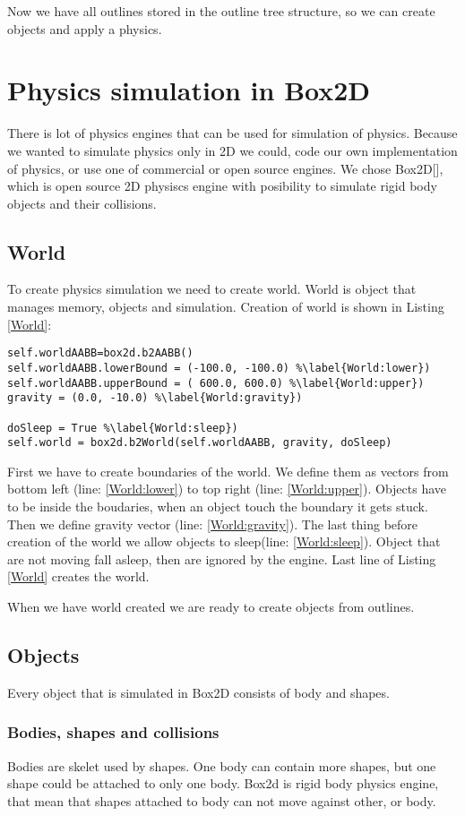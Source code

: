 \documentclass{ifacconf}
\begin{document}
Now we have all outlines stored in the outline tree structure, so we can create
objects and apply a physics.

\section{Physics simulation in Box2D}
There is lot of physics engines that can be used for simulation of physics.
Because we wanted to simulate physics only in 2D we could, code our own
implementation of physics, or use one of commercial or open source engines. We
chose Box2D[\cite{GameEngines}], which is open source 2D physiscs engine with
posibility to simulate rigid body objects and their collisions.
\subsection{World}
To create physics simulation we need to create world. World is object that
manages memory, objects and simulation. Creation of world is shown in Listing
\ref{World}:
\begin{lstlisting}[caption=Creation of Box2D world,label=World]
self.worldAABB=box2d.b2AABB()
self.worldAABB.lowerBound = (-100.0, -100.0) %\label{World:lower})
self.worldAABB.upperBound = ( 600.0, 600.0)	%\label{World:upper})
gravity = (0.0, -10.0) %\label{World:gravity})

doSleep = True %\label{World:sleep})
self.world = box2d.b2World(self.worldAABB, gravity, doSleep)
\end{lstlisting}
First we have to create boundaries of the world. We define them as vectors from
bottom left (line: \ref{World:lower}) to top right (line:
\ref{World:upper}). Objects have to be inside the boudaries, when an object
touch the boundary it gets stuck. Then we define gravity vector (line:
\ref{World:gravity}). The last thing before creation of the world we allow
objects to sleep(line: \ref{World:sleep}). Object that are not moving fall
asleep, then are ignored by the engine. Last line of Listing \ref{World} creates
the world.

When we have world created we are ready to create objects from outlines.
\subsection{Objects}
Every object that is simulated in Box2D consists of body and shapes.
\subsubsection{Bodies, shapes and collisions}
Bodies are skelet used by shapes. One body can contain more shapes, but one
shape could be attached to only one body. Box2d is rigid body
physics engine, that mean that shapes attached to body can not move against
other, or body.
\end{document}
